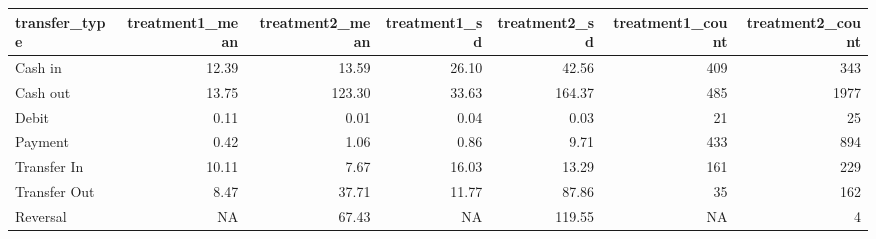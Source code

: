 
\begin{tabular}{lrrrrrr}
\toprule
transfer\_type & treatment1\_mean & treatment2\_mean & treatment1\_sd & treatment2\_sd & treatment1\_count & treatment2\_count\\
\midrule
Cash in & 12.39 & 13.59 & 26.10 & 42.56 & 409 & 343\\
Cash out & 13.75 & 123.30 & 33.63 & 164.37 & 485 & 1977\\
Debit & 0.11 & 0.01 & 0.04 & 0.03 & 21 & 25\\
Payment & 0.42 & 1.06 & 0.86 & 9.71 & 433 & 894\\
Transfer In & 10.11 & 7.67 & 16.03 & 13.29 & 161 & 229\\
\addlinespace
Transfer Out & 8.47 & 37.71 & 11.77 & 87.86 & 35 & 162\\
Reversal & NA & 67.43 & NA & 119.55 & NA & 4\\
\bottomrule
\end{tabular}
